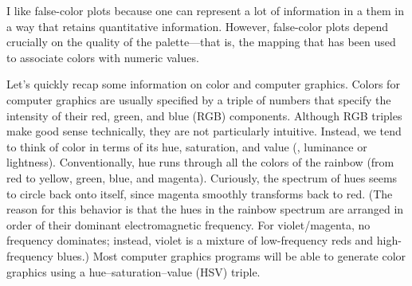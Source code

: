 I like false-color plots because one can represent a lot of
information in a them in a way that retains quantitative information.
However, false-color plots depend crucially on the quality of the
palette---that is, the mapping that has been used to associate colors
with numeric values.

Let's quickly recap some information on color and computer graphics.
Colors for computer graphics are usually specified by a triple of
numbers that specify the intensity of their red, green, and blue (RGB)
components. Although RGB triples make good sense technically, they are
not particularly intuitive. Instead, we tend to think of color in
terms of its hue, saturation, and value (\ie, luminance  or lightness).
Conventionally, hue runs through all the colors of the rainbow (from
red to yellow, green, blue, and magenta). Curiously, the spectrum of
hues seems to circle back onto itself, since magenta smoothly transforms
back to red. (The reason for this behavior is that the hues in the
rainbow spectrum are arranged in order of their dominant
electromagnetic frequency. For violet/magenta, no frequency dominates;
instead, violet is a mixture of low-frequency reds and high-frequency
blues.) Most computer graphics programs will be able to generate color
graphics using a hue--saturation--value (HSV) triple.

